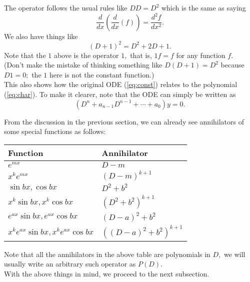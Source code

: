 \begin{mdframed}[style=boxstyle, frametitle={Some arithmetic}]
	The operator follows the usual rules like $DD = D^2$ which is the same as saying
	\begin{equation*} 
		\dfrac{d}{dx}\left(\dfrac{d}{dx}(f)\right) = \dfrac{d^2f}{dx^2}.
	\end{equation*}
	We also have things like
	\begin{equation*} 
		(D + 1)^2 = D^2 + 2D + 1.
	\end{equation*}
	Note that the $1$ above is the operator $1,$ that is, $1f = f$ for any function $f.$\\
	(Don't make the mistake of thinking something like $D(D + 1) = D^2$ because $D1 = 0;$ the $1$ here is not the constant function.)\\
	This also shows how the original ODE (\ref{eq:const}) relates to the polynomial (\ref{eq:char}). To make it clearer, note that the ODE can simply be written as
	\begin{equation*} 
		(D^n + a_{n-1}D^{n-1} + \cdots + a_0)y = 0.
	\end{equation*}
\end{mdframed}
\newpage
\begin{mdframed}[style=boxstyle, frametitle={Annihilators of special functions}]
	From the discussion in the previous section, we can already see annihilators of some special functions as follows:
	\begin{center}
	\bgroup
	\def\arraystretch{1.25}
	\begin{tabular}{|l|l|}
		\hline
		Function & Annihilator\\
		\hline
		$e^{mx}$ & $D - m$\\
		$x^{k}e^{mx}$ & $(D - m)^{k+1}$\\
		$\sin bx, \cos bx$ & $D^2 + b^2$\\
		$x^k\sin bx, x^k\cos bx$ & $(D^2 + b^2)^{k+1}$\\
		$e^{ax}\sin bx, e^{ax}\cos bx$ & $(D - a)^2 + b^2$\\
		$x^ke^{ax}\sin bx, x^ke^{ax}\cos bx$ & $((D - a)^2 + b^2)^{k+1}$\\
		\hline
	\end{tabular}
	\egroup
	\end{center}
\end{mdframed}	
Note that all the annihilators in the above table are polynomials in $D,$ we will usually write an arbitrary such operator as $P(D).$\\
With the above things in mind, we proceed to the next subsection. 

